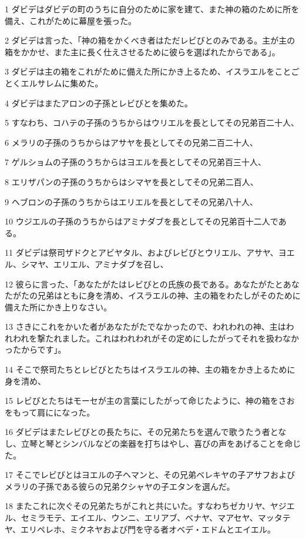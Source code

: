 \par 1 ダビデはダビデの町のうちに自分のために家を建て、また神の箱のために所を備え、これがために幕屋を張った。
\par 2 ダビデは言った、「神の箱をかくべき者はただレビびとのみである。主が主の箱をかかせ、また主に長く仕えさせるために彼らを選ばれたからである」。
\par 3 ダビデは主の箱をこれがために備えた所にかき上るため、イスラエルをことごとくエルサレムに集めた。
\par 4 ダビデはまたアロンの子孫とレビびとを集めた。
\par 5 すなわち、コハテの子孫のうちからはウリエルを長としてその兄弟百二十人、
\par 6 メラリの子孫のうちからはアサヤを長としてその兄弟二百二十人、
\par 7 ゲルショムの子孫のうちからはヨエルを長としてその兄弟百三十人、
\par 8 エリザパンの子孫のうちからはシマヤを長としてその兄弟二百人、
\par 9 ヘブロンの子孫のうちからはエリエルを長としてその兄弟八十人、
\par 10 ウジエルの子孫のうちからはアミナダブを長としてその兄弟百十二人である。
\par 11 ダビデは祭司ザドクとアビヤタル、およびレビびとウリエル、アサヤ、ヨエル、シマヤ、エリエル、アミナダブを召し、
\par 12 彼らに言った、「あなたがたはレビびとの氏族の長である。あなたがたとあなたがたの兄弟はともに身を清め、イスラエルの神、主の箱をわたしがそのために備えた所にかき上りなさい。
\par 13 さきにこれをかいた者があなたがたでなかったので、われわれの神、主はわれわれを撃たれました。これはわれわれがその定めにしたがってそれを扱わなかったからです」。
\par 14 そこで祭司たちとレビびとたちはイスラエルの神、主の箱をかき上るために身を清め、
\par 15 レビびとたちはモーセが主の言葉にしたがって命じたように、神の箱をさおをもって肩にになった。
\par 16 ダビデはまたレビびとの長たちに、その兄弟たちを選んで歌うたう者となし、立琴と琴とシンバルなどの楽器を打ちはやし、喜びの声をあげることを命じた。
\par 17 そこでレビびとはヨエルの子ヘマンと、その兄弟ベレキヤの子アサフおよびメラリの子孫である彼らの兄弟クシャヤの子エタンを選んだ。
\par 18 またこれに次ぐその兄弟たちがこれと共にいた。すなわちゼカリヤ、ヤジエル、セミラモテ、エイエル、ウンニ、エリアブ、ベナヤ、マアセヤ、マッタテヤ、エリペレホ、ミクネヤおよび門を守る者オベデ・エドムとエイエル。
